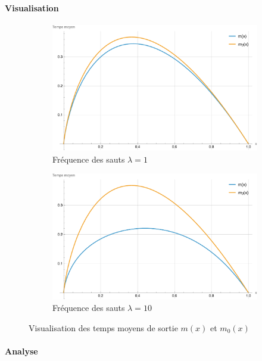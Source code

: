 \paragraph{Visualisation}\phantom{}
\begin{figure}[htb]
    \centering
    \begin{subfigure}{0.49\linewidth}
        \includegraphics[width=\linewidth]{img/validation/Jumps/mean_jumps.pdf}
        \caption{Fréquence des sauts $\lambda=1$}
    \end{subfigure}
    \hfill
    \begin{subfigure}{0.49\linewidth}
        \includegraphics[width=\linewidth]{img/validation/Jumps/mean_big_jumps.pdf}
        \caption{Fréquence des sauts $\lambda=10$}
    \end{subfigure}
    \caption{Visualisation des temps moyens de sortie $m(x)$ et $m_0(x)$}\label{fig:JumpsMeanVisualisation}
\end{figure}
\FloatBarrier\paragraph{Analyse}\phantom{}\\
